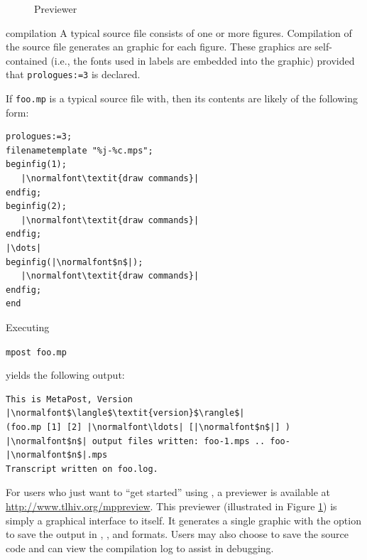 \begin{figure}
	\begin{center}
		\caption{\MP{} Previewer}\label{fig:previewer}
	\end{center}
\end{figure}

\begin{section}{\MP{} compilation}
A typical \MP{} source file consists of one or more figures.  Compilation of the source file generates an \EPS{} graphic for each figure.  These \EPS{} graphics are self-contained (i.e., the fonts used in labels are embedded into the graphic) provided that \lstinline{prologues:=3} is declared.

If \texttt{foo.mp} is a typical \MP{} source file with, then its contents are likely of the following form:
\begin{lstlisting}[xleftmargin=1.25\parindent]
prologues:=3;
filenametemplate "%j-%c.mps";
beginfig(1);
   |\normalfont\textit{draw commands}|
endfig;
beginfig(2);
   |\normalfont\textit{draw commands}|
endfig;
|\dots|
beginfig(|\normalfont$n$|);
   |\normalfont\textit{draw commands}|
endfig;
end
\end{lstlisting}
Executing \begin{flushleft}\hspace*{1.25\parindent}\texttt{mpost foo.mp}\end{flushleft} yields the following output:
\begin{lstlisting}[xleftmargin=1.25\parindent]
This is MetaPost, Version |\normalfont$\langle$\textit{version}$\rangle$|
(foo.mp [1] [2] |\normalfont\ldots| [|\normalfont$n$|] )
|\normalfont$n$| output files written: foo-1.mps .. foo-|\normalfont$n$|.mps
Transcript written on foo.log.
\end{lstlisting}

For users who just want to ``get started'' using \MP{}, a \MP{} previewer is available at \url{http://www.tlhiv.org/mppreview}.  This previewer (illustrated in Figure \ref{fig:previewer}) is simply a graphical interface to \MP{} itself.
It generates a single graphic with the option to save the output in \EPS{}, \PDF{}, and \SVG{} formats.  Users may also choose to save the source code and can view the compilation log to assist in debugging.
\end{section}
